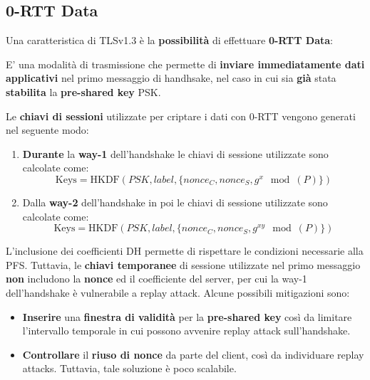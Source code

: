 \subsection{0-RTT Data}
Una caratteristica di TLSv1.3 è la \textbf{possibilità} di effettuare \textbf{0-RTT Data}:
\begin{definition}\label{def:zerortt}
E' una modalità di trasmissione che permette di \textbf{inviare immediatamente dati applicativi} nel primo messaggio di handhsake, nel caso in cui sia \textbf{già} stata \textbf{stabilita} la \textbf{pre-shared key} PSK.
\end{definition}
Le \textbf{chiavi di sessioni} utilizzate per criptare i dati con 0-RTT vengono generati nel seguente modo:
\begin{definition}\label{def:zerorttkey}
\begin{enumerate}
    \item \textbf{Durante} la \textbf{way-1} dell'handshake le chiavi di sessione utilizzate sono calcolate come:
    \[\text{Keys}=\text{HKDF}(PSK,label,\{nonce_C,nonce_S,g^{x}\mod(P)\})\]
    \item Dalla \textbf{way-2} dell'handshake in poi le chiavi di sessione utilizzate sono calcolate come:
    \[\text{Keys}=\text{HKDF}(PSK,label,\{nonce_C,nonce_S,g^{xy}\mod(P)\})\]
\end{enumerate}
\end{definition}
L'inclusione dei coefficienti DH permette di rispettare le condizioni necessarie alla PFS. Tuttavia, le \textbf{chiavi temporanee} di sessione utilizzate nel primo messaggio \textbf{non} includono la \textbf{nonce} ed il coefficiente del server, per cui la way-1 dell'handshake è vulnerabile a replay attack. Alcune possibili mitigazioni sono:
\begin{itemize}
    \item \textbf{Inserire} una \textbf{finestra di validità} per la \textbf{pre-shared key} così da limitare l'intervallo temporale in cui possono avvenire replay attack sull'handshake.
    \item \textbf{Controllare} il \textbf{riuso di nonce} da parte del client, così da individuare replay attacks. Tuttavia, tale soluzione è poco scalabile.
\end{itemize}
